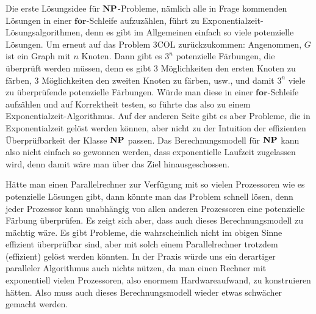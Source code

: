 Die erste Lösungsidee für $\mathbf{N}\mathbf{P}$-Probleme, nämlich alle in Frage
kommenden Lösungen in einer $\mathbf{for}$-Schleife aufzuzählen, führt
zu Exponentialzeit-Lösungsalgorithmen, denn es gibt im Allgemeinen
einfach so viele potenzielle Lösungen. Um erneut auf das Problem
$3\mathrm{COL}$ zurückzukommen: Angenommen, $G$ ist ein Graph mit $n$
Knoten. Dann gibt es $3^n$ potenzielle Färbungen, die überprüft werden
müssen, denn es gibt $3$ Möglichkeiten den ersten Knoten zu färben,
$3$ Möglichkeiten den zweiten Knoten zu färben, usw., und damit $3^n$
viele zu überprüfende potenzielle Färbungen. Würde man diese in einer
$\mathbf{for}$-Schleife aufzählen und auf Korrektheit testen, so
führte das also zu einem Exponentialzeit-Algorithmus.  Auf der anderen
Seite gibt es aber Probleme, die in Exponentialzeit gelöst werden
können, aber nicht zu der Intuition der effizienten Überprüfbarkeit
der Klasse $\mathbf{N}\mathbf{P}$ passen.  Das Berechnungsmodell für $\mathbf{N}\mathbf{P}$ kann also
nicht einfach so gewonnen werden, dass exponentielle Laufzeit
zugelassen wird, denn damit wäre man über das Ziel hinausgeschossen.

Hätte man einen Parallelrechner zur Verfügung mit so vielen
Prozessoren wie es potenzielle Lösungen gibt, dann könnte man das
Problem schnell lösen, denn jeder Prozessor kann unabhängig von allen
anderen Prozessoren eine potenzielle Färbung überprüfen. Es zeigt sich
aber, dass auch dieses Berechnungsmodell zu mächtig wäre. Es gibt
Probleme, die wahrscheinlich nicht im obigen Sinne effizient
überprüfbar sind, aber mit solch einem Parallelrechner trotzdem
(effizient) gelöst werden könnten. In der Praxis würde uns ein
derartiger paralleler Algorithmus auch nichts nützen, da man einen
Rechner mit exponentiell vielen Prozessoren, also enormem
Hardwareaufwand, zu konstruieren hätten. Also muss auch dieses
Berechnungsmodell wieder etwas schwächer gemacht werden.

